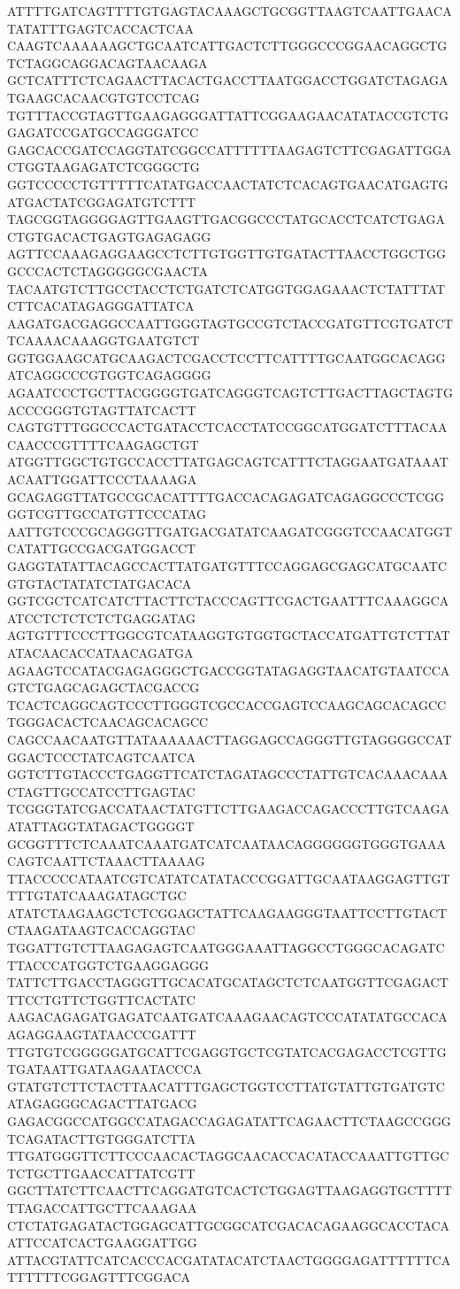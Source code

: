 ATTTTGATCAGTTTTGTGAGTACAAAGCTGCGGTTAAGTCAATTGAACATATATTTGAGTCACCACTCAA
CAAGTCAAAAAAGCTGCAATCATTGACTCTTGGGCCCGGAACAGGCTGTCTAGGCAGGACAGTAACAAGA
GCTCATTTCTCAGAACTTACACTGACCTTAATGGACCTGGATCTAGAGATGAAGCACAACGTGTCCTCAG
TGTTTACCGTAGTTGAAGAGGGATTATTCGGAAGAACATATACCGTCTGGAGATCCGATGCCAGGGATCC
GAGCACCGATCCAGGTATCGGCCATTTTTTAAGAGTCTTCGAGATTGGACTGGTAAGAGATCTCGGGCTG
GGTCCCCCTGTTTTTCATATGACCAACTATCTCACAGTGAACATGAGTGATGACTATCGGAGATGTCTTT
TAGCGGTAGGGGAGTTGAAGTTGACGGCCCTATGCACCTCATCTGAGACTGTGACACTGAGTGAGAGAGG
AGTTCCAAAGAGGAAGCCTCTTGTGGTTGTGATACTTAACCTGGCTGGGCCCACTCTAGGGGGCGAACTA
TACAATGTCTTGCCTACCTCTGATCTCATGGTGGAGAAACTCTATTTATCTTCACATAGAGGGATTATCA
AAGATGACGAGGCCAATTGGGTAGTGCCGTCTACCGATGTTCGTGATCTTCAAAACAAAGGTGAATGTCT
GGTGGAAGCATGCAAGACTCGACCTCCTTCATTTTGCAATGGCACAGGATCAGGCCCGTGGTCAGAGGGG
AGAATCCCTGCTTACGGGGTGATCAGGGTCAGTCTTGACTTAGCTAGTGACCCGGGTGTAGTTATCACTT
CAGTGTTTGGCCCACTGATACCTCACCTATCCGGCATGGATCTTTACAACAACCCGTTTTCAAGAGCTGT
ATGGTTGGCTGTGCCACCTTATGAGCAGTCATTTCTAGGAATGATAAATACAATTGGATTCCCTAAAAGA
GCAGAGGTTATGCCGCACATTTTGACCACAGAGATCAGAGGCCCTCGGGGTCGTTGCCATGTTCCCATAG
AATTGTCCCGCAGGGTTGATGACGATATCAAGATCGGGTCCAACATGGTCATATTGCCGACGATGGACCT
GAGGTATATTACAGCCACTTATGATGTTTCCAGGAGCGAGCATGCAATCGTGTACTATATCTATGACACA
GGTCGCTCATCATCTTACTTCTACCCAGTTCGACTGAATTTCAAAGGCAATCCTCTCTCTCTGAGGATAG
AGTGTTTCCCTTGGCGTCATAAGGTGTGGTGCTACCATGATTGTCTTATATACAACACCATAACAGATGA
AGAAGTCCATACGAGAGGGCTGACCGGTATAGAGGTAACATGTAATCCAGTCTGAGCAGAGCTACGACCG
TCACTCAGGCAGTCCCTTGGGTCGCCACCGAGTCCAAGCAGCACAGCCTGGGACACTCAACAGCACAGCC
CAGCCAACAATGTTATAAAAAACTTAGGAGCCAGGGTTGTAGGGGCCATGGACTCCCTATCAGTCAATCA
GGTCTTGTACCCTGAGGTTCATCTAGATAGCCCTATTGTCACAAACAAACTAGTTGCCATCCTTGAGTAC
TCGGGTATCGACCATAACTATGTTCTTGAAGACCAGACCCTTGTCAAGAATATTAGGTATAGACTGGGGT
GCGGTTTCTCAAATCAAATGATCATCAATAACAGGGGGGTGGGTGAAACAGTCAATTCTAAACTTAAAAG
TTACCCCCATAATCGTCATATCATATACCCGGATTGCAATAAGGAGTTGTTTTGTATCAAAGATAGCTGC
ATATCTAAGAAGCTCTCGGAGCTATTCAAGAAGGGTAATTCCTTGTACTCTAAGATAAGTCACCAGGTAC
TGGATTGTCTTAAGAGAGTCAATGGGAAATTAGGCCTGGGCACAGATCTTACCCATGGTCTGAAGGAGGG
TATTCTTGACCTAGGGTTGCACATGCATAGCTCTCAATGGTTCGAGACTTTCCTGTTCTGGTTCACTATC
AAGACAGAGATGAGATCAATGATCAAAGAACAGTCCCATATATGCCACAAGAGGAAGTATAACCCGATTT
TTGTGTCGGGGGATGCATTCGAGGTGCTCGTATCACGAGACCTCGTTGTGATAATTGATAAGAATACCCA
GTATGTCTTCTACTTAACATTTGAGCTGGTCCTTATGTATTGTGATGTCATAGAGGGCAGACTTATGACG
GAGACGGCCATGGCCATAGACCAGAGATATTCAGAACTTCTAAGCCGGGTCAGATACTTGTGGGATCTTA
TTGATGGGTTCTTCCCAACACTAGGCAACACCACATACCAAATTGTTGCTCTGCTTGAACCATTATCGTT
GGCTTATCTTCAACTTCAGGATGTCACTCTGGAGTTAAGAGGTGCTTTTTTAGACCATTGCTTCAAAGAA
CTCTATGAGATACTGGAGCATTGCGGCATCGACACAGAAGGCACCTACAATTCCATCACTGAAGGATTGG
ATTACGTATTCATCACCCACGATATACATCTAACTGGGGAGATTTTTTCATTTTTTCGGAGTTTCGGACA
